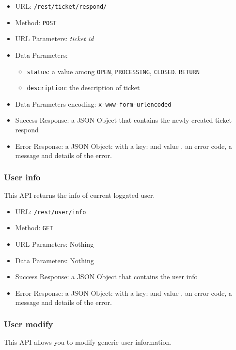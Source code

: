 \begin{itemize}
    \item URL: \texttt{/rest/ticket/respond/}
    \item Method: \texttt{POST}
    \item URL Parameters: \textit{ticket id}
    \item Data Parameters:
    \begin{itemize}
        \item \texttt{status}: a value among \texttt{OPEN}, \texttt{PROCESSING}, \texttt{CLOSED}. \texttt{RETURN}
        \item \texttt{description}: the description of ticket
    \end{itemize}
    \item Data Parameters encoding: \texttt{x-www-form-urlencoded}
    \item Success Response: a JSON Object that contains the newly created ticket respond
    \item Error Response: a JSON Object: with a key:   and value , an error code, a message and details of the error.
\end{itemize}

\subsubsection*{User info}

This API returns the info of current loggated user.

\begin{itemize}
    \item URL: \texttt{/rest/user/info}
    \item Method: \texttt{GET}
    \item URL Parameters: Nothing
    \item Data Parameters: Nothing
    \item Success Response: a JSON Object that contains the user info
    \item Error Response: a JSON Object: with a key:   and value , an error code, a message and details of the error.
\end{itemize}


\subsubsection*{User modify}

This API allows you to modify generic user information.

